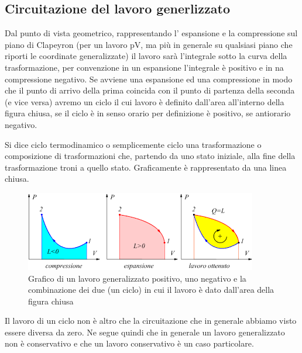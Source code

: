 \documentclass[
10pt, %
a4paper, %
oneside, %
headinclude,footinclude, %
BCOR5mm, %
]{scrartcl}
\begin{document}
\subsection{Circuitazione del lavoro generlizzato}
Dal punto di vista geometrico, rappresentando l' espansione e la compressione sul piano di Clapeyron (per un lavoro pV, ma più in generale su qualsiasi piano che riporti le coordinate generalizzate) il lavoro sarà l'integrale sotto la curva della trasformazione, per convenzione in un espansione l'integrale è positivo e in na compressione negativo. Se avviene una espansione ed una compressione in modo che il punto di arrivo della prima coincida con il punto di partenza della seconda (e vice versa) avremo un ciclo il cui lavoro è definito dall'area all'interno della figura chiusa, se il ciclo è in senso orario per definizione è positivo, se antiorario negativo. 
\begin{definition}
	Si dice ciclo termodinamico o semplicemente ciclo una trasformazione o composizione di trasformazioni che, partendo da uno stato iniziale, alla fine della trasformazione troni a quello stato. Graficamente è rappresentato da una linea chiusa. 
\end{definition}
\begin{figure}[h!]
	\centering
	\includegraphics[width=0.6 \linewidth]{../images/ciclo}
	\caption{Grafico di un lavoro generalizzato positivo, uno negativo e la combinazione dei due (un ciclo) in cui il lavoro è dato dall'area della figura chiusa}
	\label{fig:ciclo}
\end{figure}
\FloatBarrier
Il lavoro di un ciclo non è altro che la circuitazione che in generale abbiamo visto essere diversa da zero. Ne segue quindi che in generale un lavoro generalizzato non è conservativo e che un lavoro conservativo è un caso particolare.
\newpage
\end{document}
